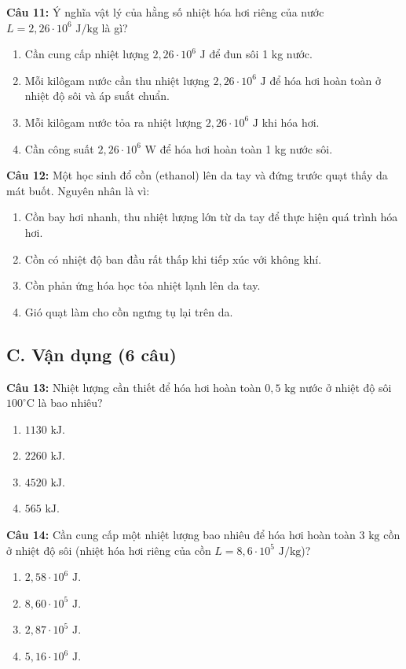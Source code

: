 \documentclass[12pt,a4paper]{article}
\begin{document}
\textbf{Câu 11:} Ý nghĩa vật lý của hằng số nhiệt hóa hơi riêng của nước $L = 2{,}26 \cdot 10^6\text{ J/kg}$ là gì?
\begin{enumerate}[label=\Alph*.]
  \item Cần cung cấp nhiệt lượng $2{,}26 \cdot 10^6\text{ J}$ để đun sôi 1 kg nước.
  \item Mỗi kilôgam nước cần thu nhiệt lượng $2{,}26 \cdot 10^6\text{ J}$ để hóa hơi hoàn toàn ở nhiệt độ sôi và áp suất chuẩn.
  \item Mỗi kilôgam nước tỏa ra nhiệt lượng $2{,}26 \cdot 10^6\text{ J}$ khi hóa hơi.
  \item Cần công suất $2{,}26 \cdot 10^6\text{ W}$ để hóa hơi hoàn toàn 1 kg nước sôi.
\end{enumerate}

\textbf{Câu 12:} Một học sinh đổ cồn (ethanol) lên da tay và đứng trước quạt thấy da mát buốt. Nguyên nhân là vì:
\begin{enumerate}[label=\Alph*.]
  \item Cồn bay hơi nhanh, thu nhiệt lượng lớn từ da tay để thực hiện quá trình hóa hơi.
  \item Cồn có nhiệt độ ban đầu rất thấp khi tiếp xúc với không khí.
  \item Cồn phản ứng hóa học tỏa nhiệt lạnh lên da tay.
  \item Gió quạt làm cho cồn ngưng tụ lại trên da.
\end{enumerate}

\subsection*{C. Vận dụng (6 câu)}

\textbf{Câu 13:} Nhiệt lượng cần thiết để hóa hơi hoàn toàn $0{,}5\text{ kg}$ nước ở nhiệt độ sôi $100^{\circ}\text{C}$ là bao nhiêu?
\begin{enumerate}[label=\Alph*.]
  \item $1130\text{ kJ}$.
  \item $2260\text{ kJ}$.
  \item $4520\text{ kJ}$.
  \item $565\text{ kJ}$.
\end{enumerate}

\textbf{Câu 14:} Cần cung cấp một nhiệt lượng bao nhiêu để hóa hơi hoàn toàn $3\text{ kg}$ cồn ở nhiệt độ sôi (nhiệt hóa hơi riêng của cồn $L = 8{,}6 \cdot 10^5\text{ J/kg}$)?
\begin{enumerate}[label=\Alph*.]
  \item $2{,}58 \cdot 10^6\text{ J}$.
  \item $8{,}60 \cdot 10^5\text{ J}$.
  \item $2{,}87 \cdot 10^5\text{ J}$.
  \item $5{,}16 \cdot 10^6\text{ J}$.
\end{enumerate}
\end{document}
